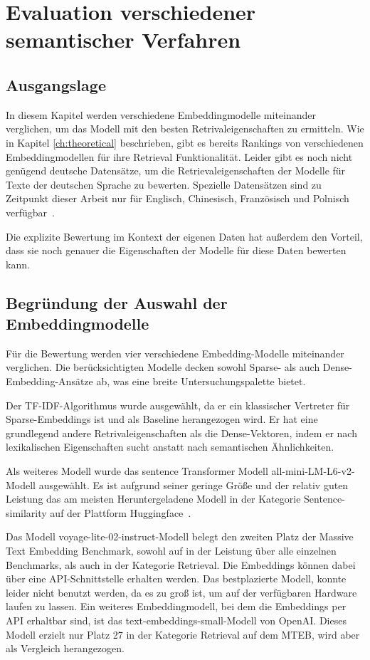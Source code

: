 \chapter{Evaluation verschiedener semantischer Verfahren}\label{ch:experiments}

\section{Ausgangslage}



In diesem Kapitel werden verschiedene Embeddingmodelle miteinander verglichen, um das Modell mit den besten Retrivaleigenschaften zu ermitteln.
Wie in Kapitel \autoref*{ch:theoretical} beschrieben, gibt es bereits Rankings von verschiedenen Embeddingmodellen für ihre Retrieval Funktionalität.
Leider gibt es noch nicht genügend deutsche Datensätze, um die Retrievaleigenschaften der Modelle für Texte der deutschen Sprache zu bewerten.
Spezielle Datensätzen sind zu Zeitpunkt dieser Arbeit nur für Englisch, Chinesisch, Französisch und Polnisch verfügbar~\cite{mteb}.

Die explizite Bewertung im Kontext der eigenen Daten hat außerdem den Vorteil, dass sie noch genauer die Eigenschaften der Modelle für diese Daten bewerten kann.

\section{Begründung der Auswahl der Embeddingmodelle}

Für die Bewertung werden vier verschiedene Embedding-Modelle miteinander verglichen.
Die berücksichtigten Modelle decken sowohl Sparse- als auch Dense-Embedding-Ansätze ab, was eine breite Untersuchungspalette bietet.

Der TF-IDF-Algorithmus wurde ausgewählt, da er ein klassischer Vertreter für Sparse-Embeddings ist und als Baseline herangezogen wird. 
Er hat eine grundlegend andere Retrivaleigenschaften als die Dense-Vektoren, indem er nach lexikalischen Eigenschaften sucht anstatt nach semantischen Ähnlichkeiten.


Als weiteres Modell wurde das sentence Transformer Modell all-mini-LM-L6-v2-Modell ausgewählt.
Es ist aufgrund seiner geringe Größe und der relativ guten Leistung das am meisten Heruntergeladene Modell in der Kategorie Sentence-similarity auf der Plattform Huggingface~\cite{2024}.

Das Modell voyage-lite-02-instruct-Modell belegt den zweiten Platz der Massive Text Embedding Benchmark, sowohl auf in der Leistung über alle einzelnen Benchmarks, als auch in der Kategorie Retrieval.
Die Embeddings können dabei über eine API-Schnittstelle erhalten werden.
Das bestplazierte Modell, konnte leider nicht benutzt werden, da es zu groß ist, um auf der verfügbaren Hardware laufen zu lassen.
Ein weiteres Embeddingmodell, bei dem die Embeddings per API erhaltbar sind, ist das text-embeddings-small-Modell von OpenAI.
Dieses Modell erzielt nur Platz 27 in der Kategorie Retrieval auf dem MTEB, wird aber als Vergleich herangezogen.


